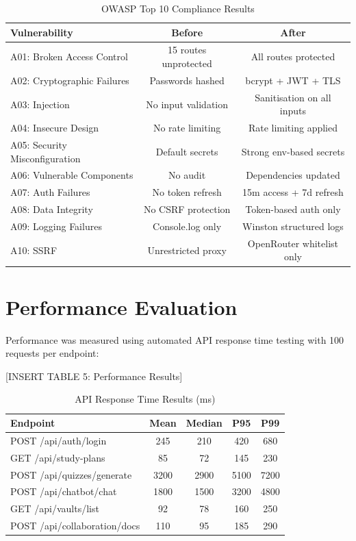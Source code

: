 \documentclass[12pt,a4paper]{report}
\begin{document}
\begin{table}[h]
\centering
\caption{OWASP Top 10 Compliance Results}
\begin{tabular}{p{6cm}cc}
\toprule
\textbf{Vulnerability} & \textbf{Before} & \textbf{After} \\
\midrule
A01: Broken Access Control & 15 routes unprotected & All routes protected \\
A02: Cryptographic Failures & Passwords hashed & bcrypt + JWT + TLS \\
A03: Injection & No input validation & Sanitisation on all inputs \\
A04: Insecure Design & No rate limiting & Rate limiting applied \\
A05: Security Misconfiguration & Default secrets & Strong env-based secrets \\
A06: Vulnerable Components & No audit & Dependencies updated \\
A07: Auth Failures & No token refresh & 15m access + 7d refresh \\
A08: Data Integrity & No CSRF protection & Token-based auth only \\
A09: Logging Failures & Console.log only & Winston structured logs \\
A10: SSRF & Unrestricted proxy & OpenRouter whitelist only \\
\bottomrule
\end{tabular}
\label{tab:security-tests}
\end{table}

\section{Performance Evaluation}

Performance was measured using automated API response time testing with 100 requests per endpoint:

[INSERT TABLE 5: Performance Results]

\begin{table}[h]
\centering
\caption{API Response Time Results (ms)}
\begin{tabular}{lcccc}
\toprule
\textbf{Endpoint} & \textbf{Mean} & \textbf{Median} & \textbf{P95} & \textbf{P99} \\
\midrule
POST /api/auth/login & 245 & 210 & 420 & 680 \\
GET /api/study-plans & 85 & 72 & 145 & 230 \\
POST /api/quizzes/generate & 3200 & 2900 & 5100 & 7200 \\
POST /api/chatbot/chat & 1800 & 1500 & 3200 & 4800 \\
GET /api/vaults/list & 92 & 78 & 160 & 250 \\
POST /api/collaboration/docs & 110 & 95 & 185 & 290 \\
\bottomrule
\end{tabular}
\label{tab:performance}
\end{table}
\end{document}
